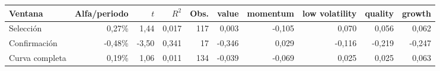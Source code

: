 \begin{tabular}{lrrrrrrrrr}
\toprule
Ventana & Alfa/periodo & $t$ & $R^2$ & Obs. & value & momentum & low volatility & quality & growth \\
\midrule
Selección & 0,27\% & 1,44 & 0,017 & 117 & 0,003 & -0,105 & 0,070 & 0,056 & 0,062 \\
Confirmación & -0,48\% & -3,50 & 0,341 & 17 & -0,346 & 0,029 & -0,116 & -0,219 & -0,247 \\
Curva completa & 0,19\% & 1,06 & 0,011 & 134 & -0,039 & -0,069 & 0,025 & 0,025 & 0,063 \\
\bottomrule
\end{tabular}
